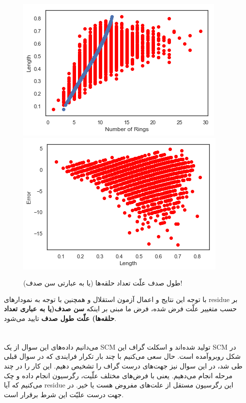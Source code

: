 \documentclass[papersize=a4]{report}
\begin{document}
\begin{figure}
	\centering
	\begin{floatrow}
		\includegraphics[scale=0.4]{aba_back1.png}
		\includegraphics[scale=0.4]{aba_back2.png}
	\end{floatrow}
\caption{طول صدف علّت تعداد حلقه‌ها (یا به عبارتی سن صدف)!}
\label{wrong}
\end{figure}
با توجه این نتایج و اعمال آزمون استقلال و همچنین با توجه به نمودارهای residue بر حسب متغییر علّت فرض شده، فرض ما مبنی بر اینکه
\textbf{سن صدف(یا به عباری تعداد حلقه‌ها) علّت طول صدف}
تایید می‌شود. 
\chapter{}

می‌دانیم داده‌های این سوال از یک SCM تولید شده‌اند و اسکلت گراف این SCM در شکل روبروآمده است. حال سعی می‌کنیم با چند بار تکرار فرایندی که در سوال قبلی طی شد، در این سوال نیز جهت‌‌های درست گراف را تشخیص دهیم.  این کار را در چند مرحله انجام می‌دهیم. یعنی با فرض‌های مختلف علّیت، رگرسیون انجام داده و چک می‌کنیم که آیا residue این رگرسیون مستقل از علت‌های مفروض هست یا خیر. در جهت درست علیّت این شرط برقرار است.
\end{document}
